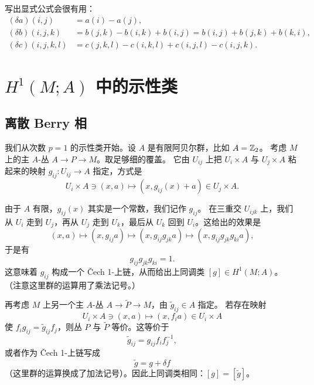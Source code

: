 写出显式公式会很有用：
\begin{align}
(\delta a)(i,j) &= a(i)-a(j), \tag{7.3}\\
(\delta b)(i,j,k) &= b(j,k)-b(i,k)+b(i,j)=b(i,j)+b(j,k)+b(k,i), \tag{7.4}\\
(\delta c)(i,j,k,l) &= c(j,k,l)-c(i,k,l)+c(i,j,l)-c(i,j,k). \tag{7.5}
\end{align}


\section{$H^1(M;A)$ 中的示性类}

\subsection{离散 Berry 相}

我们从次数 $p=1$ 的示性类开始。设 $A$ 是有限阿贝尔群，比如 $A=\mathbb{Z}_2$。
考虑 $M$ 上的主 $A$-丛 $A\to P\to M$。取足够细的覆盖。
它由 $U_{ij}$ 上把 $U_i\times A$ 与 $U_j\times A$ 粘起来的映射 $g_{ij}:U_{ij}\to A$ 指定，方式是
\begin{equation}
U_i\times A\ni(x,a)\mapsto(x,g_{ij}(x)+a)\in U_j\times A.
\tag{7.6}
\end{equation}

由于 $A$ 有限，$g_{ij}(x)$ 其实是一个常数，我们记作 $g_{ij}$。
在三重交 $U_{ijk}$ 上，我们从 $U_i$ 走到 $U_j$，再从 $U_j$ 走到 $U_k$，最后从 $U_k$ 回到 $U_i$。这给出的效果是
\begin{equation}
(x,a)\mapsto(x,g_{ij}a)\mapsto(x,g_{ij}g_{jk}a)\mapsto(x,g_{ij}g_{jk}g_{ki}a),
\tag{7.7}
\end{equation}
于是有
\begin{equation}
g_{ij}g_{jk}g_{ki}=1.
\tag{7.8}
\end{equation}
这意味着 $g_{ij}$ 构成一个 Čech 1-上链，从而给出上同调类 $[g]\in H^1(M;A)$。
（注意这里群的运算用了乘法记号。）

再考虑 $M$ 上另一个主 $A$-丛 $A\to\tilde P\to M$，由 $\tilde g_{ij}\in A$ 指定。
若存在映射
\begin{equation}
U_i\times A\ni(x,a)\mapsto(x,f_ia)\in U_i\times A
\tag{7.9}
\end{equation}
使 $f_ig_{ij}=\tilde g_{ij}f_j$，则丛 $P$ 与 $\tilde P$ 等价。这等价于
\begin{equation}
\tilde g_{ij}=g_{ij}f_if_j^{-1},
\tag{7.10}
\end{equation}
或者作为 Čech 1-上链写成
\begin{equation}
\tilde g=g+\delta f
\tag{7.11}
\end{equation}
（这里群的运算换成了加法记号）。因此上同调类相同：$[g]=[\tilde g]$。

